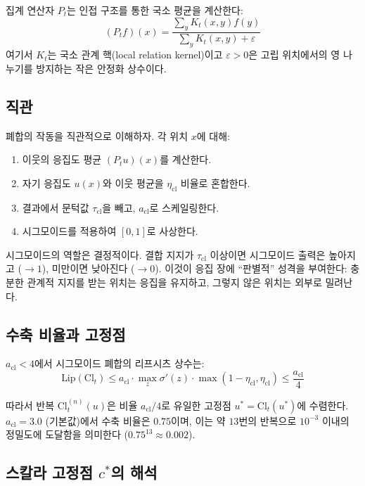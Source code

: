 집계 연산자 $P_t$는 인접 구조를 통한 국소 평균을 계산한다:
\begin{equation}
    (P_t f)(x) = \frac{\sum_y K_t(x,y) f(y)}{\sum_y K_t(x,y) + \varepsilon}
\end{equation}
여기서 $K_t$는 국소 관계 핵(local relation kernel)이고 $\varepsilon > 0$은 고립 위치에서의 영 나누기를 방지하는 작은 안정화 상수이다.

\subsection{직관}

폐합의 작동을 직관적으로 이해하자. 각 위치 $x$에 대해:
\begin{enumerate}
    \item 이웃의 응집도 평균 $(P_t u)(x)$를 계산한다.
    \item 자기 응집도 $u(x)$와 이웃 평균을 $\eta_{\mathrm{cl}}$ 비율로 혼합한다.
    \item 결과에서 문턱값 $\tau_{\mathrm{cl}}$을 빼고, $a_{\mathrm{cl}}$로 스케일링한다.
    \item 시그모이드를 적용하여 $[0,1]$로 사상한다.
\end{enumerate}

시그모이드의 역할은 결정적이다. 결합 지지가 $\tau_{\mathrm{cl}}$ 이상이면 시그모이드 출력은 높아지고 ($\to 1$), 미만이면 낮아진다 ($\to 0$). 이것이 응집 장에 ``판별적'' 성격을 부여한다: 충분한 관계적 지지를 받는 위치는 응집을 유지하고, 그렇지 않은 위치는 외부로 밀려난다.

\subsection{수축 비율과 고정점}

$a_{\mathrm{cl}} < 4$에서 시그모이드 폐합의 리프시츠 상수는:
\begin{equation}
    \text{Lip}(\mathrm{Cl}_t) \leq a_{\mathrm{cl}} \cdot \max_z \sigma'(z) \cdot \max(1-\eta_{\mathrm{cl}}, \eta_{\mathrm{cl}}) \leq \frac{a_{\mathrm{cl}}}{4}
\end{equation}

따라서 반복 $\mathrm{Cl}_t^{(n)}(u)$은 비율 $a_{\mathrm{cl}}/4$로 유일한 고정점 $u^* = \mathrm{Cl}_t(u^*)$에 수렴한다. $a_{\mathrm{cl}} = 3.0$ (기본값)에서 수축 비율은 $0.75$이며, 이는 약 $13$번의 반복으로 $10^{-3}$ 이내의 정밀도에 도달함을 의미한다 ($0.75^{13} \approx 0.002$).

\subsection{스칼라 고정점 $c^*$의 해석}

